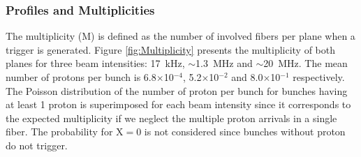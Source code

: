 \documentclass[a4paper,11pt]{article}
\begin{document}
\subsubsection{Profiles and Multiplicities}
\label{Profiles_And_Multiplies}

The multiplicity (M) is defined as the number of involved fibers per plane when a trigger is generated.
Figure \ref{fig:Multiplicity} presents the multiplicity of both planes for three beam intensities: 17~kHz, $\sim$1.3~MHz and $\sim$20~MHz. The mean number of protons per bunch is 6.8$\times$10$^{-4}$, 5.2$\times$10$^{-2}$ and 8.0$\times$10$^{-1}$ respectively. The Poisson distribution of the number of proton per bunch for bunches having at least 1 proton is superimposed for each beam intensity since it corresponds to the expected multiplicity if we neglect the multiple proton arrivals in a single fiber. The probability for X$ = 0$ is not considered since bunches without proton do not trigger. 
\end{document}
